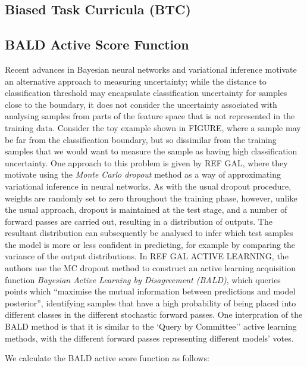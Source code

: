 \subsection{Biased Task Curricula (BTC)}

\subsection{BALD Active Score Function}
Recent advances in Bayesian neural networks and variational inference motivate an alternative approach to measuring uncertainty; while the distance to classification threshold may encapsulate classification uncertainty for samples close to the boundary, it does not consider the uncertainty associated with analysing samples from parts of the feature space that is not represented in the training data. Consider the toy example shown in FIGURE, where a sample may be far from the classification boundary, but so dissimilar from the training samples that we would want to measure the sample as having high classification uncertainty. One approach to this problem is given by REF GAL, where they motivate using the \textit{Monte Carlo dropout} method as a way of approximating variational inference in neural networks. As with the usual dropout procedure, weights are randomly set to zero throughout the training phase, however, unlike the usual approach, dropout is maintained at the test stage, and a number of forward passes are carried out, resulting in a distribution of outputs. The resultant distribution can subsequently be analysed to infer which test samples the model is more or less confident in predicting, for example by comparing the variance of the output distributions. In REF GAL ACTIVE LEARNING, the authors use the MC dropout method to construct an active learning acquisition function \textit{Bayesian Active Learning by Disagreement (BALD)}, which queries points which ``maximise the mutual information between predictions and model posterior'', identifying samples that have a high probability of being placed into different classes in the different stochastic forward passes. One interpration of the BALD method is that it is similar to the `Query by Committee'' active learning methods, with the different forward passes representing different models' votes. 

We calculate the BALD active score function as follows:

